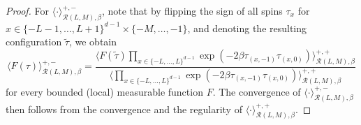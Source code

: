 \documentclass[11pt,a4paper]{article}
\numberwithin{equation}{section}
\theoremstyle{plain}
\theoremstyle{definition}
\begin{document}
\begin{proof}
For $\langle \cdot \rangle^{+,-}_{\mathcal{R}(L,M),\beta}$, note that by flipping the sign of all spins $\tau_x$ for $x\in \{-L-1,\ldots,L+1\}^{d-1}\times \{-M,\ldots,-1\}$, and denoting the resulting configuration $\tilde \tau$,  we obtain
\begin{equation}
\langle F(\tau) \rangle^{+,-}_{\mathcal{R}(L,M),\beta}=  \frac{\langle F(\tilde \tau) \prod_{x\in \{-L,\ldots,L\}^{d-1}}\exp(-2\beta \tau_{(x,-1)} \tau_{(x,0)} )\rangle^{+,+}_{\mathcal{R}(L,M),\beta}}{\langle \prod_{x\in \{-L,\ldots,L\}^{d-1}}\exp(-2\beta \tau_{(x,-1)} \tau_{(x,0)} )\rangle^{+,+}_{\mathcal{R}(L,M),\beta}}  
\end{equation}
for every bounded (local) measurable function $F$. The convergence of $\langle \cdot \rangle^{+,-}_{\mathcal{R}(L,M),\beta}$ then follows from the convergence and the regularity of $\langle \cdot \rangle^{+,+}_{\mathcal{R}(L,M),\beta}$.

\vspace{5pt}


\end{proof}
\end{document}
